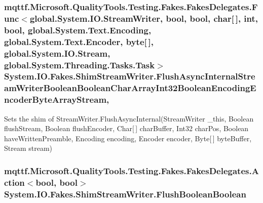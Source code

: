 \hypertarget{class_system_1_1_i_o_1_1_fakes_1_1_shim_stream_writer_a23749d74664c7e9e0e08f667d33ad6b5}{
\subsubsection[{Flush\-Async\-Internal\-Stream\-Writer\-Boolean\-Boolean\-Char\-Array\-Int32\-Boolean\-Encoding\-Encoder\-Byte\-Array\-Stream}]{\setlength{\rightskip}{0pt plus 5cm}mqttf.\-Microsoft.\-Quality\-Tools.\-Testing.\-Fakes.\-Fakes\-Delegates.\-Func$<$global.\-System.\-I\-O.\-Stream\-Writer, bool, bool, char\mbox{[}$\,$\mbox{]}, int, bool, global.\-System.\-Text.\-Encoding, global.\-System.\-Text.\-Encoder, byte\mbox{[}$\,$\mbox{]}, global.\-System.\-I\-O.\-Stream, global.\-System.\-Threading.\-Tasks.\-Task$>$ System.\-I\-O.\-Fakes.\-Shim\-Stream\-Writer.\-Flush\-Async\-Internal\-Stream\-Writer\-Boolean\-Boolean\-Char\-Array\-Int32\-Boolean\-Encoding\-Encoder\-Byte\-Array\-Stream\hspace{0.3cm}{\ttfamily [static]}, {\ttfamily [set]}}}\label{class_system_1_1_i_o_1_1_fakes_1_1_shim_stream_writer_a23749d74664c7e9e0e08f667d33ad6b5}


Sets the shim of Stream\-Writer.\-Flush\-Async\-Internal(\-Stream\-Writer \-\_\-this, Boolean flush\-Stream, Boolean flush\-Encoder, Char\mbox{[}$\,$\mbox{]} char\-Buffer, Int32 char\-Pos, Boolean have\-Written\-Preamble, Encoding encoding, Encoder encoder, Byte\mbox{[}$\,$\mbox{]} byte\-Buffer, Stream stream)

\hypertarget{class_system_1_1_i_o_1_1_fakes_1_1_shim_stream_writer_a701dd87c17a96515d464ff52878998d6}{
\subsubsection[{Flush\-Boolean\-Boolean}]{\setlength{\rightskip}{0pt plus 5cm}mqttf.\-Microsoft.\-Quality\-Tools.\-Testing.\-Fakes.\-Fakes\-Delegates.\-Action$<$bool, bool$>$ System.\-I\-O.\-Fakes.\-Shim\-Stream\-Writer.\-Flush\-Boolean\-Boolean\hspace{0.3cm}{\ttfamily [set]}}}\label{class_system_1_1_i_o_1_1_fakes_1_1_shim_stream_writer_a701dd87c17a96515d464ff52878998d6}


